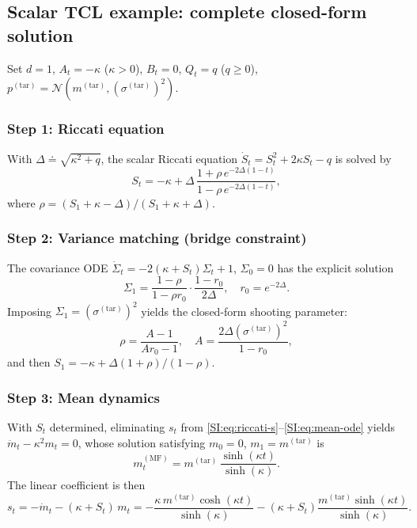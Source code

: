 \documentclass[11pt,onecolumn]{article}
\newcommand{\calN}{\mathcal{N}}
\newcommand{\ptar}{p^{(\mathrm{tar})}}
\newcommand{\MF}{\mathrm{MF}}
\begin{document}
\subsection{Scalar TCL example: complete closed-form solution}
\label{SI:lqg:tcl}

Set $d=1$, $A_t=-\kappa$ ($\kappa>0$), $B_t=0$, $Q_t=q$ ($q\geq0$),
$\ptar = \calN(m^{(\mathrm{tar})},(\sigma^{(\mathrm{tar})})^2)$.

\subsubsection{Step 1: Riccati equation}
With $\Delta\doteq\sqrt{\kappa^2+q}$, the scalar Riccati equation
$\dot S_t = S_t^2 + 2\kappa S_t - q$ is solved by
\begin{equation}
  S_t = -\kappa + \Delta\,
  \frac{1 + \rho\,e^{-2\Delta(1-t)}}{1 - \rho\,e^{-2\Delta(1-t)}},
  \label{SI:eq:St-scalar}
\end{equation}
where $\rho = (S_1+\kappa-\Delta)/(S_1+\kappa+\Delta)$.

\subsubsection{Step 2: Variance matching (bridge constraint)}
The covariance ODE $\dot\Sigma_t = -2(\kappa+S_t)\Sigma_t + 1$,
$\Sigma_0=0$ has the explicit solution
\begin{equation}
  \Sigma_1 = \frac{1-\rho}{1-\rho r_0}\cdot\frac{1-r_0}{2\Delta},
  \quad r_0 = e^{-2\Delta}.
  \label{SI:eq:Sigma1}
\end{equation}
Imposing $\Sigma_1 = (\sigma^{(\mathrm{tar})})^2$ yields the
closed-form shooting parameter:
\begin{equation}
  \rho = \frac{A-1}{A r_0 - 1},
  \quad
  A = \frac{2\Delta(\sigma^{(\mathrm{tar})})^2}{1-r_0},
  \label{SI:eq:rho-scalar}
\end{equation}
and then $S_1 = -\kappa + \Delta(1+\rho)/(1-\rho)$.

\subsubsection{Step 3: Mean dynamics}
With $S_t$ determined, eliminating $s_t$ from
\eqref{SI:eq:riccati-s}--\eqref{SI:eq:mean-ode} yields
$\ddot m_t - \kappa^2 m_t = 0$,
whose solution satisfying $m_0=0$, $m_1=m^{(\mathrm{tar})}$ is
\begin{equation}
  m_t^{(\MF)}
  = m^{(\mathrm{tar})}\,\frac{\sinh(\kappa t)}{\sinh(\kappa)}.
  \label{SI:eq:mt-mf}
\end{equation}
The linear coefficient is then
\begin{equation}
  s_t = -\dot m_t - (\kappa + S_t)\,m_t
  = -\frac{\kappa\,m^{(\mathrm{tar})}\cosh(\kappa t)}{\sinh(\kappa)}
    - (\kappa + S_t)
      \frac{m^{(\mathrm{tar})}\sinh(\kappa t)}{\sinh(\kappa)}.
  \label{SI:eq:st-mf}
\end{equation}
\end{document}
